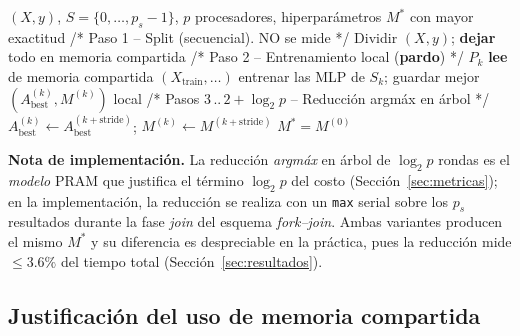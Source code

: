 \documentclass[11pt,a4paper]{article}
\begin{document}
\begin{algorithm}[H]
\caption{PRAM-CREW: entrenamiento de múltiples MLP (memoria compartida)}
\label{alg:pram}
\begin{algorithmic}[1]
\Require $(X,y)$, $S=\{0,\dots,p_s{-}1\}$, $p$ procesadores, hiperparámetros
\Ensure $M^\ast$ con mayor exactitud
\Statex \textcolor{black!55}{/* Paso 1 -- Split (secuencial). NO se mide */}
\State Dividir $(X,y)$; \textbf{dejar} todo en memoria compartida
\Statex \textcolor{black!55}{/* Paso 2 -- Entrenamiento local (\textbf{pardo}) */}
 
  \State $P_k$ \textbf{lee} de memoria compartida $(X_{\text{train}},\dots)$ 
  \State entrenar las MLP de $S_k$; guardar mejor $(A^{(k)}_{\text{best}}, M^{(k)})$ local
\EndFor
\Statex \textcolor{black!55}{/* Pasos 3\,..\,$2{+}\log_2 p$ -- Reducción arg\-máx en árbol */}
 
       $A^{(k)}_{\text{best}}\gets A^{(k+\text{stride})}_{\text{best}}$;\; $M^{(k)}\gets M^{(k+\text{stride})}$
    \EndIf
  \EndFor
\EndFor
\State \Return $M^\ast=M^{(0)}$
\end{algorithmic}
\end{algorithm}

\textbf{Nota de implementación.} La reducción \emph{arg\-máx} en árbol de
$\log_2 p$ rondas es el \emph{modelo} PRAM que justifica el término $\log_2 p$
del costo (Sección~\ref{sec:metricas}); en la implementación, la reducción se
realiza con un \texttt{max} serial sobre los $p_s$ resultados durante la fase
\emph{join} del esquema \emph{fork--join}. Ambas variantes producen el mismo
$M^\ast$ y su diferencia es despreciable en la práctica, pues la reducción mide
$\le 3.6\%$ del tiempo total (Sección~\ref{sec:resultados}).

\subsection{Justificación del uso de memoria compartida}
\label{sec:just}
\end{document}
